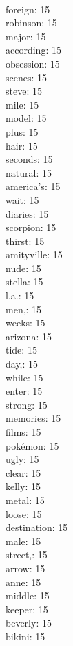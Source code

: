 \begin{multicols}{6}
  \\ foreign: 15
  \\ robinson: 15
  \\ major: 15
  \\ according: 15
  \\ obsession: 15
  \\ scenes: 15
  \\ steve: 15
  \\ mile: 15
  \\ model: 15
  \\ plus: 15
  \\ hair: 15
  \\ seconds: 15
  \\ natural: 15
  \\ america's: 15
  \\ wait: 15
  \\ diaries: 15
  \\ scorpion: 15
  \\ thirst: 15
  \\ amityville: 15
  \\ nude: 15
  \\ stella: 15
  \\ l.a.: 15
  \\ men,: 15
  \\ weeks: 15
  \\ arizona: 15
  \\ tide: 15
  \\ day,: 15
  \\ while: 15
  \\ enter: 15
  \\ strong: 15
  \\ memories: 15
  \\ films: 15
  \\ pokémon: 15
  \\ ugly: 15
  \\ clear: 15
  \\ kelly: 15
  \\ metal: 15
  \\ loose: 15
  \\ destination: 15
  \\ male: 15
  \\ street,: 15
  \\ arrow: 15
  \\ anne: 15
  \\ middle: 15
  \\ keeper: 15
  \\ beverly: 15
  \\ bikini: 15

\end{multicols}
